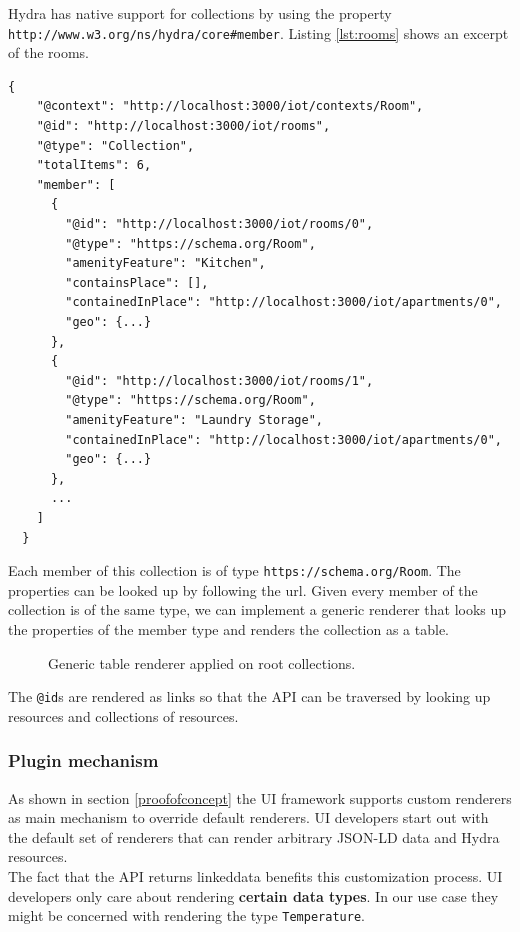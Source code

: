 Hydra has native support for collections by using the property \lstinline{http://www.w3.org/ns/hydra/core#member}. Listing \ref{lst:rooms} shows an excerpt of the rooms.

\lstset{language=JSON}
\begin{lstlisting}[caption=Data of /rooms as Hydra collection., label=lst:rooms]
  {
    "@context": "http://localhost:3000/iot/contexts/Room",
    "@id": "http://localhost:3000/iot/rooms",
    "@type": "Collection",
    "totalItems": 6,
    "member": [
      {
        "@id": "http://localhost:3000/iot/rooms/0",
        "@type": "https://schema.org/Room",
        "amenityFeature": "Kitchen",
        "containsPlace": [],
        "containedInPlace": "http://localhost:3000/iot/apartments/0",
        "geo": {...}
      },
      {
        "@id": "http://localhost:3000/iot/rooms/1",
        "@type": "https://schema.org/Room",
        "amenityFeature": "Laundry Storage",
        "containedInPlace": "http://localhost:3000/iot/apartments/0",
        "geo": {...}
      },
      ...
    ]
  }
\end{lstlisting}

Each member of this collection is of type \lstinline{https://schema.org/Room}. The properties can be looked up by following the \gls{url}. Given every member of the collection is of the same type, we can implement a generic renderer that looks up the properties of the member type and renders the collection as a table.

\begin{figure}[!htb]
  \caption{Generic table renderer applied on root collections.}
\end{figure}

The \lstinline{@id}s are rendered as links so that the API can be traversed by looking up resources and collections of resources.

\subsubsection{Plugin mechanism}\label{pluginmechanism}
As shown in section \ref{proofofconcept} the UI framework supports custom renderers as main mechanism to override default renderers. UI developers start out with the default set of renderers that can render arbitrary JSON-LD data and Hydra resources. \\
The fact that the API returns \gls{linkeddata} benefits this customization process. UI developers only care about rendering \textbf{certain data types}. In our use case they might be concerned with rendering the type \lstinline{Temperature}.

